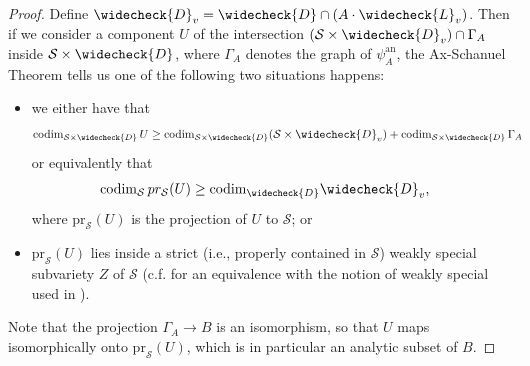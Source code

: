\documentclass[letter, 11pt]{article}
\theoremstyle{plain}
\theoremstyle{definition}
\newcommand{\IV}{\mathbb{V}}
\newcommand{\che}[1]{\widecheck{#1}}
\newcommand{\<}{\langle}
\renewcommand{\>}{\rangle}
\newcommand{\sH}{\mathcal{H}}
\newcommand{\sS}{\mathcal{S}}
\newcommand{\codim}{\mathrm{codim}}
\newcommand{\pr}{\mathrm{pr}}
\begin{document}
\begin{proof}






Define $\che{D}_{v} = \che{D} \cap (A \cdot \che{L}_{v})$. Then if we consider a component $U$ of the intersection $(\sS \times \che{D}_{v}) \cap \Gamma_{A}$ inside $\sS \times \che{D}$, where $\Gamma_{A}$ denotes the graph of $\psi^{\mathrm{an}}_{A}$, the Ax-Schanuel Theorem \cite{zbMATH07066495} tells us one of the following two situations happens:
\begin{itemize}
\item[(a)] we either have that
\begin{align*}
 \codim_{\sS \times \che{D}} \, U &\geq \codim_{\sS \times \che{D}} (\sS \times \che{D}_{v}) + \codim_{\sS \times \che{D}} \, \Gamma_{A}
 \end{align*}
 or equivalently that
\begin{align*}
\codim_{\sS} \, \textrm{pr}_{\sS}(U) &\geq \codim_{\che{D}} \che{D}_{v},
\end{align*}
where $\pr_\sS(U)$ is the projection of $U$ to $\sS$;
or
\item[(b)] $\pr_\sS(U)$ lies inside a strict (i.e., properly contained in $\sS$) weakly special subvariety $Z$ of $\sS$ (c.f. \cite[Cor. 4.14]{zbMATH07387423} for an equivalence with the notion of weakly special used in \cite{zbMATH07066495}).
\end{itemize}
Note that the projection $\Gamma_A \to B$ is an isomorphism, so that $U$ maps isomorphically onto $\pr_\sS(U)$, which is in particular an analytic subset of $B$. 


\end{proof}
\end{document}
